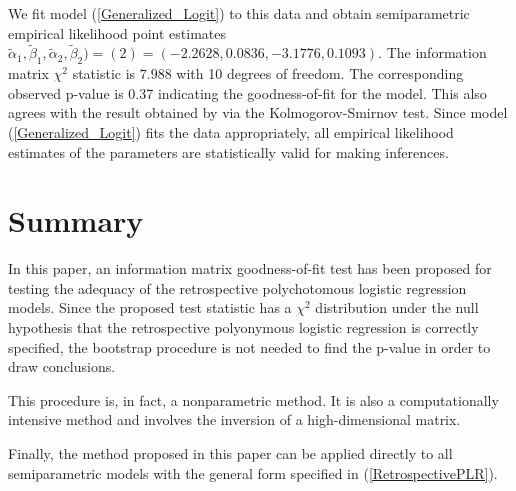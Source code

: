 \documentclass[12]{interact}
\theoremstyle{plain}%
\theoremstyle{definition}
\theoremstyle{remark}
\begin{document}
We fit model (\ref{Generalized_Logit}) to this data and obtain semiparametric empirical likelihood point estimates
$\tilde{\alpha}_1, \tilde{\beta}_1, \tilde{\alpha}_2, \tilde{\beta}_2)=(2)=(-2.2628, 0.0836, -3.1776, 0.1093)$. The information matrix $\chi^2$ statistic is $7.988$ with 10 degrees of freedom. The corresponding observed p-value is 0.37 indicating the goodness-of-fit for the model. This also agrees with the result obtained by \cite{ZhangBiao-JMA-2002} via the Kolmogorov-Smirnov test. Since model (\ref{Generalized_Logit}) fits the data appropriately, all empirical likelihood estimates of the parameters are statistically valid for making inferences.

\section{Summary}
In this paper, an information matrix goodness-of-fit test has been proposed for testing the adequacy of the retrospective polychotomous logistic regression models. Since the proposed test statistic has a $\chi^2$ distribution under the null hypothesis that the retrospective polyonymous logistic regression is correctly specified, the bootstrap procedure is not needed to find the p-value in order to draw conclusions.

This procedure is, in fact, a nonparametric method. It is also a computationally intensive method and involves the inversion of a high-dimensional matrix.

Finally, the method proposed in this paper can be applied directly to all semiparametric models with the general form specified in (\ref{RetrospectivePLR}).


\end{document}
